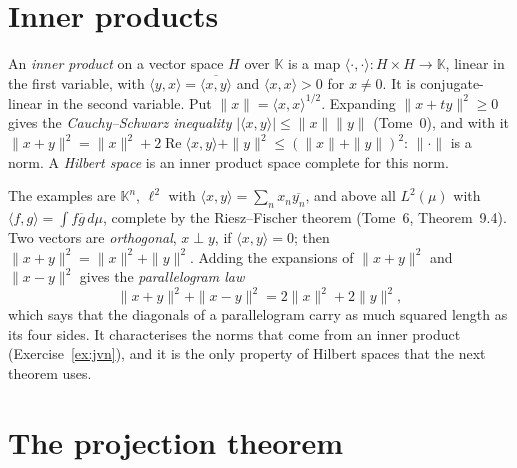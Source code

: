 \section{Inner products}

An \emph{inner product} on a vector space $H$ over $\mathbb K$ is a map $\langle\cdot,\cdot\rangle:H\times H\to\mathbb K$, linear in the first variable, with $\langle y,x\rangle=\overline{\langle x,y\rangle}$ and $\langle x,x\rangle>0$ for
$x\ne0$. It is conjugate-linear in the second variable. Put $\|x\|=\langle x,x\rangle^{1/2}$. Expanding $\|x+ty\|^2\ge0$ gives the \emph{Cauchy--Schwarz inequality} $|\langle x,y\rangle|\le\|x\|\|y\|$ (Tome~0), and with it
$\|x+y\|^2=\|x\|^2+2\operatorname{Re}\langle x,y\rangle+\|y\|^2\le(\|x\|+\|y\|)^2$: $\|\cdot\|$ is a norm. A \emph{Hilbert space} is an inner product space complete for this norm.

The examples are $\mathbb K^n$, $\ell^2$ with $\langle x,y\rangle=\sum_nx_n\overline{y_n}$, and above all $L^2(\mu)$ with $\langle f,g\rangle=\int f\overline g\,d\mu$, complete by the Riesz--Fischer theorem (Tome~6, Theorem~9.4). Two vectors are
\emph{orthogonal}, $x\perp y$, if $\langle x,y\rangle=0$; then $\|x+y\|^2=\|x\|^2+\|y\|^2$. Adding the expansions of $\|x+y\|^2$ and $\|x-y\|^2$ gives the \emph{parallelogram law}
\[\|x+y\|^2+\|x-y\|^2=2\|x\|^2+2\|y\|^2,\]
which says that the diagonals of a parallelogram carry as much squared length as its four sides. It characterises the norms that come from an inner product (Exercise~\ref{ex:jvn}), and it is the only property of Hilbert
spaces that the next theorem uses.

\section{The projection theorem}

